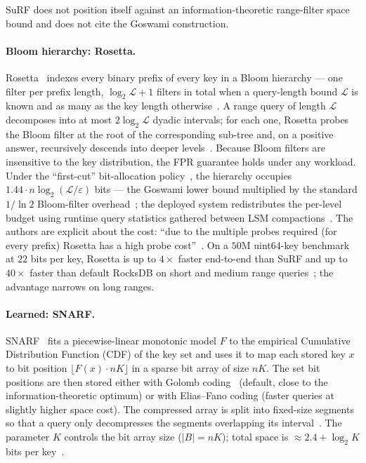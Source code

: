 SuRF does not position itself against an information-theoretic
range-filter space bound and does not cite the Goswami construction.

\paragraph{Bloom hierarchy: Rosetta.}
Rosetta~\citep{luo2020rosetta} indexes every binary prefix of every
key in a Bloom hierarchy --- one filter per prefix length,
$\log_2 \mathcal{L} + 1$ filters in total when a query-length bound
$\mathcal{L}$ is known and as many as the key length
otherwise~\citep[\S2.1, \S3.1]{luo2020rosetta}. A range query of
length $\mathcal{L}$ decomposes into at most $2 \log_2 \mathcal{L}$
dyadic intervals; for each one, Rosetta probes the Bloom filter at
the root of the corresponding sub-tree and, on a positive answer,
recursively descends into deeper
levels~\citep[\S2.2.1]{luo2020rosetta}. Because Bloom filters are
insensitive to the key distribution, the FPR guarantee holds under
any workload.
Under the ``first-cut'' bit-allocation
policy~\citep[\S2.3]{luo2020rosetta}, the hierarchy occupies
$1.44 \cdot n \log_2(\mathcal{L}/\varepsilon)$ bits --- the Goswami
lower bound multiplied by the standard $1/\ln 2$ Bloom-filter
overhead~\citep[\S3.1]{luo2020rosetta}; the deployed system
redistributes the per-level budget using runtime query statistics
gathered between LSM compactions~\citep[\S2.4]{luo2020rosetta}.
The authors are explicit about the cost: ``due to the multiple
probes required (for every prefix) Rosetta has a high probe
cost''~\citep[\S1]{luo2020rosetta}. On a $50$M uint64-key benchmark
at $22$ bits per key, Rosetta is up to $4\times$ faster end-to-end
than SuRF and up to $40\times$ faster than default RocksDB on short
and medium range queries~\citep[\S5, Fig.~5(A1), (D)]{luo2020rosetta};
the advantage narrows on long ranges.

\paragraph{Learned: SNARF.}
SNARF~\citep{vaidya2022snarf} fits a piecewise-linear monotonic
model $F$ to the empirical Cumulative Distribution Function (CDF) of
the key set and uses it to map each stored key $x$ to bit position
$\lfloor F(x) \cdot nK \rfloor$ in a sparse bit array of size $nK$.
The set bit positions are then stored either with
Golomb coding~\citep{golomb1966runlength} (default, close to the
information-theoretic optimum) or with Elias--Fano coding (faster queries at slightly
higher space cost).
The compressed array is split into fixed-size
segments so that a query only decompresses the segments overlapping
its interval~\citep[\S2.3.2]{vaidya2022snarf}.
The parameter $K$ controls the bit array size ($|B| = nK$); total
space is $\approx 2.4 + \log_2 K$ bits per
key~\citep[\S3]{vaidya2022snarf}.

